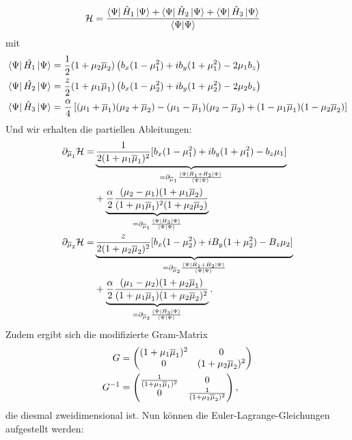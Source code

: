\begin{align}
    \mathcal{H} &= \frac{\bra{\Psi}\hat{H}_1\ket{\Psi}+ \bra{\Psi}\hat{H}_2\ket{\Psi} +\bra{\Psi}\hat{H}_3\ket{\Psi}}{\bra{\Psi}\ket{\Psi}}
\end{align}
mit
\begin{align}
   \bra{\Psi}\hat{H_1}\ket{\Psi} &= \frac{1}{2}(1+\mu_2\overline{\mu}_2)\left(b_x(1-\mu_1^2) + ib_y(1+\mu_1^2) - 2\mu_1 b_z\right)\\
   \bra{\Psi}\hat{H_2}\ket{\Psi} &= \frac{z}{2}(1+\mu_1\overline{\mu}_1)\left(b_x(1-\mu_2^2) + ib_y(1+\mu_2^2) - 2\mu_2 b_z\right)\\
   \bra{\Psi}\hat{H}_3\ket{\Psi} &= \frac{\alpha}{4}\left[( \mu_1 + \overline{\mu}_1)( \mu_2 + \overline{\mu}_2) - (\mu_1-\overline{\mu}_1)(\mu_2 - \overline{\mu}_2) + (1-\mu_1\overline{\mu}_1)(1-\mu_2\overline{\mu}_2)\right]
\end{align}  
Und wir erhalten die partiellen Ableitungen:
\begin{align}
    \partial_{\overline{\mu}_1}\mathcal{H} =& \underbrace{\frac{1}{2(1+\mu_1\overline{\mu}_1)^2}[b_x(1-\mu_1^2) + ib_y(1+\mu_1^2) - b_z\mu_1]}_{= \partial_{\overline{\mu}_1} \frac{\bra{\Psi}\hat{H}_1 + \hat{H}_2\ket{\Psi}}{\bra{\Psi}\ket{\Psi}}} \nonumber\\
    &+ \underbrace{\frac{\alpha}{2}\frac{(\mu_2 -\mu_1)(1+\mu_1\overline{\mu}_2)}{(1+\mu_1\overline{\mu}_1)^2(1+\mu_2\overline{\mu}_2)}}_{= \partial_{\overline{\mu}_1} \frac{\bra{\Psi}\hat{H}_3\ket{\Psi}}{\bra{\Psi}\ket{\Psi}}}\\
    \partial_{\overline{\mu}_2}\mathcal{H} =& \underbrace{\frac{z}{2(1+\mu_2\overline{\mu}_2)^2}[b_x(1-\mu_2^2) + iB_y(1+\mu_2^2) - B_z\mu_2]}_{= \partial_{\overline{\mu}_2} \frac{\bra{\Psi}\hat{H}_1 + \hat{H}_2\ket{\Psi}}{\bra{\Psi}\ket{\Psi}}} \nonumber \\
    &+ \underbrace{\frac{\alpha}{2}\frac{(\mu_1 -\mu_2)(1+\mu_2\overline{\mu}_1)}{(1+\mu_1\overline{\mu}_1)(1+\mu_2\overline{\mu}_2)^2}}_{= \partial_{\overline{\mu}_2} \frac{\bra{\Psi}\hat{H}_3\ket{\Psi}}{\bra{\Psi}\ket{\Psi}}}\space .
\end{align}
Zudem ergibt sich die modifizierte Gram-Matrix
\begin{align}
    G &=
    \begin{pmatrix}
        (1+\mu_1\overline{\mu}_1)^2 & 0 \\
        0 &(1+\mu_2\overline{\mu}_2)^2
    \end{pmatrix} \\
    G^{-1} &=
    \begin{pmatrix}
        \frac{1}{(1+\mu_1\overline{\mu}_1)^2} & 0 \\
        0 &\frac{1}{(1+\mu_2\overline{\mu}_2)^2}
    \end{pmatrix}\space ,
\end{align}
die diesmal zweidimensional ist.
\noindent Nun können die Euler-Lagrange-Gleichungen aufgestellt werden:

